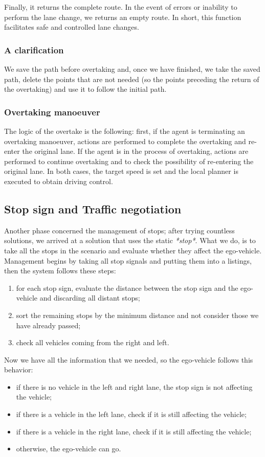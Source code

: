 \documentclass{article}
\begin{document}
Finally, it returns the complete route. In the event of errors or inability to 
perform the lane change, we returns an empty route. In short, this function facilitates safe and 
controlled lane changes.

\subsubsection*{A clarification} We save the path before overtaking and, once we have finished, we take the saved path, 
delete the points that are not needed (so the points preceding the return of the overtaking) and use it
to follow the initial path.

\subsubsection*{Overtaking manoeuver}
The logic of the overtake is the following:
first, if the agent is terminating an overtaking manoeuver, actions are performed to complete the overtaking and 
re-enter the original lane. If the agent is in the process of overtaking, actions are performed to continue 
overtaking and to check the possibility of re-entering the original lane. In both cases, the target speed 
is set and the local planner is executed to obtain driving control.

\subsection{Stop sign and Traffic negotiation}
Another phase concerned the management of stops; after trying countless solutions, we arrived at a solution that 
uses the static \textit{*stop*}. What we do, is to take all the stops in the scenario and evaluate whether they 
affect the ego-vehicle. 
Management begins by taking all stop signals and putting them into a listings, then the system follows these steps:
\begin{enumerate}
    \item for each stop sign, evaluate the distance between the stop sign and the ego-vehicle and discarding all distant stops;
    \item sort the remaining stops by the minimum distance and not consider those we have already passed;
    \item check all vehicles coming from the right and left.
\end{enumerate}
Now we have all the information that we needed, so the ego-vehicle follows this behavior:
\begin{itemize}
    \item if there is no vehicle in the left and right lane, the stop sign is not affecting the vehicle;
    \item if there is a vehicle in the left lane, check if it is still affecting the vehicle;
    \item if there is a vehicle in the right lane, check if it is still affecting the vehicle;
    \item otherwise, the ego-vehicle can go.
\end{itemize}
\end{document}
